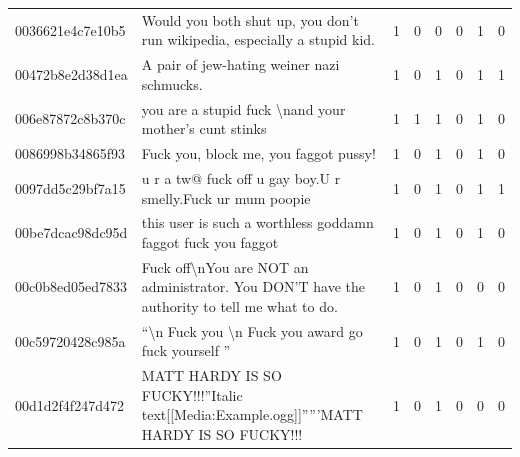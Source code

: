 \begin{table}[htb]
{\begin{minipage}{\textheight}
\begin{threeparttable}
\begin{tabularx}{\textwidth}{L{0.8} L{6.6} C{0.1} C{0.1} C{0.1} C{0.1} C{0.1} C{0.1}}
                    0036621e4c7e10b5 & Would you both shut up, you don't run wikipedia, especially a stupid kid.                                                        & 1           & 0           & 0           & 0           & 1           & 0           \\
                    00472b8e2d38d1ea & A pair of jew-hating weiner nazi schmucks.                                                                                       & 1           & 0           & 1           & 0           & 1           & 1           \\
                    006e87872c8b370c & you are a stupid fuck \textbackslash nand your mother's cunt stinks                                                              & 1           & 1           & 1           & 0           & 1           & 0           \\
                    0086998b34865f93 & Fuck you, block me, you faggot pussy!                                                                                            & 1           & 0           & 1           & 0           & 1           & 0           \\
                    0097dd5c29bf7a15 & u r a tw@ fuck off u gay boy.U r smelly.Fuck ur mum poopie                                                                       & 1           & 0           & 1           & 0           & 1           & 1           \\
                    00be7dcac98dc95d & this user is such a worthless goddamn faggot fuck you faggot                                                                     & 1           & 0           & 1           & 0           & 1           & 0           \\
                    00c0b8ed05ed7833 & Fuck off\textbackslash nYou are NOT an administrator. You DON'T have the authority to tell me what to do.                        & 1           & 0           & 1           & 0           & 0           & 0           \\
                    00c59720428c985a & ``\textbackslash n Fuck you \textbackslash n Fuck you award go fuck yourself ''                                                  & 1           & 0           & 1           & 0           & 1           & 0           \\
                    00d1d2f4f247d472 & MATT HARDY IS SO FUCKY!!!''Italic text[[Media:Example.ogg]]'''''MATT HARDY IS SO FUCKY!!!                                        & 1           & 0           & 1           & 0           & 0           & 0           \\

\end{tabularx}
\end{threeparttable}
\end{minipage}}
\end{table}
